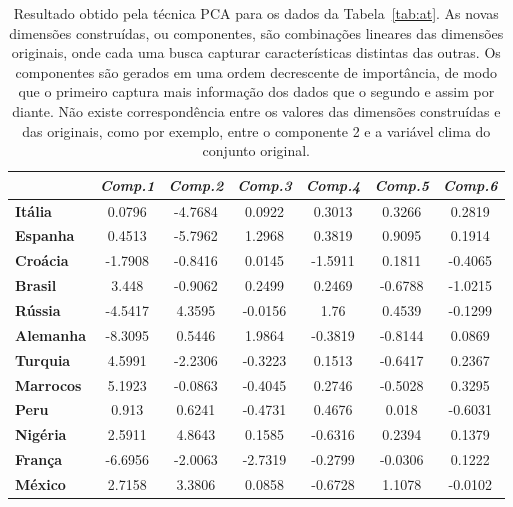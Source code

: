 \begin{table}[htbp]
    \caption[Resultado de PCA]{Resultado obtido pela técnica
        PCA para os dados da Tabela~\ref{tab:at}. As novas
        dimensões construídas, ou componentes, são
        combinações lineares das dimensões originais, onde
        cada uma busca capturar características distintas
        das outras. Os componentes são gerados em uma ordem
        decrescente de importância, de modo que o primeiro
        captura mais informação dos dados que o segundo e
        assim por diante. Não existe correspondência entre
        os valores das dimensões construídas e das
        originais, como por exemplo, entre o componente 2 e
        a variável clima do conjunto original.}
    \begin{center}
        \begin{tabular}{|l|c|c|c|c|c|c|}
            \hline
            & \multicolumn{1}{l|}{\textbf{\textit{Comp.1}}}
            & \multicolumn{1}{l|}{\textbf{\textit{Comp.2}}}
            & \multicolumn{1}{l|}{\textbf{\textit{Comp.3}}}
            & \multicolumn{1}{l|}{\textbf{\textit{Comp.4}}}
            & \multicolumn{1}{l|}{\textbf{\textit{Comp.5}}}
            & \multicolumn{1}{l|}{\textbf{\textit{Comp.6}}}
            \\ \hline
            \textbf{Itália} & 0.0796 & -4.7684 & 0.0922 & 0.3013 & 0.3266 & 0.2819 \\ \hline
            \textbf{Espanha} & 0.4513 & -5.7962 & 1.2968 & 0.3819 & 0.9095 & 0.1914 \\ \hline
            \textbf{Croácia} & -1.7908 & -0.8416 & 0.0145 & -1.5911 & 0.1811 & -0.4065 \\ \hline
            \textbf{Brasil} & 3.448 & -0.9062 & 0.2499 & 0.2469 & -0.6788 & -1.0215 \\ \hline
            \textbf{Rússia} & -4.5417 & 4.3595 & -0.0156 & 1.76 & 0.4539 & -0.1299 \\ \hline
            \textbf{Alemanha} & -8.3095 & 0.5446 & 1.9864 & -0.3819 & -0.8144 & 0.0869 \\ \hline
            \textbf{Turquia} & 4.5991 & -2.2306 & -0.3223 & 0.1513 & -0.6417 & 0.2367 \\ \hline
            \textbf{Marrocos} & 5.1923 & -0.0863 & -0.4045 & 0.2746 & -0.5028 & 0.3295 \\ \hline
            \textbf{Peru} & 0.913 & 0.6241 & -0.4731 & 0.4676 & 0.018 & -0.6031 \\ \hline
            \textbf{Nigéria} & 2.5911 & 4.8643 & 0.1585 & -0.6316 & 0.2394 & 0.1379 \\ \hline
            \textbf{França} & -6.6956 & -2.0063 & -2.7319 & -0.2799 & -0.0306 & 0.1222 \\ \hline
            \textbf{México} & 2.7158 & 3.3806 & 0.0858 & -0.6728 & 1.1078 & -0.0102 \\ \hline
        \end{tabular}
    \end{center}
    \label{tab:at-pcs}
\end{table}

